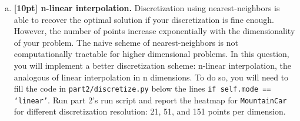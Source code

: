 \documentclass{article}
\begin{document}
\begin{enumerate}[(a)]
\newpage
\item {\bf [10pt] n-linear interpolation.} Discretization using nearest-neighbors is able to recover the optimal solution if your discretization is fine enough. However, the number of points increase exponentially with the dimensionality of your problem. The naive scheme of nearest-neighbors is not computationally tractable for higher dimensional problems. In this question, you will implement a better discretization scheme: n-linear interpolation, the analogous of linear interpolation in n dimensions. To do so, you will need to fill the code in \texttt{part2/discretize.py} below the lines \texttt{if self.mode == `linear'}. Run part 2's run script and report the heatmap for \texttt{MountainCar} for different discretization resolution: 21, 51, and 151 points per dimension.


\end{enumerate}
\end{document}
